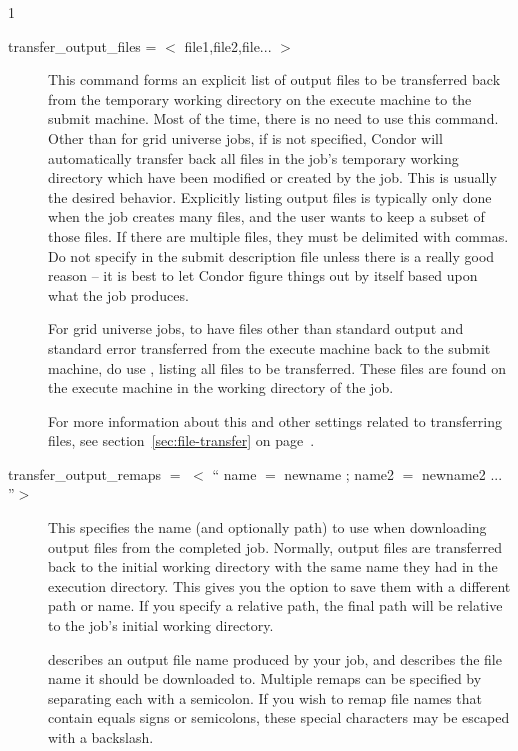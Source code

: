 \begin{ManPage}{\label{man-condor-submit}}{1}
\begin{description}
\item[transfer\_output\_files = $<$ file1,file2,file... $>$]
This command forms an explicit list of output files to be transferred
back from the temporary working directory on the execute machine to
the submit machine.
Most of the time, there is no need to use this command.
Other than for grid universe jobs,
if  is not specified,
Condor will automatically transfer back all files in the job's
temporary working directory which have been
modified or created by the job.
This is usually the desired behavior.
Explicitly listing output files is typically only done when the job creates
many files, and the user wants to keep a subset of
those files.
If there are multiple files, they must be delimited with commas.
\Warn Do not specify  in the
submit description file unless there is a really good reason -- it is
best to let Condor figure things out by itself based upon what
the job produces.

For grid universe jobs,
to have files other than standard output and standard error transferred
from the execute machine back to the submit machine,
do use , listing
all files to be transferred.
These files are found on the execute machine in the
working directory of the job.

For more information about this and other settings related to
transferring files, see section~\ref{sec:file-transfer} on
page~\pageref{sec:file-transfer}.


\item[transfer\_output\_remaps $=$ $<$ `` name $=$ newname ; name2 $=$ newname2 ... ''$>$ ]
This specifies the name (and optionally path) to use when downloading output
files from the completed job.  Normally, output files are transferred back
to the initial working directory with the same name they had in the execution
directory.  This gives you the option to save them with a different path
or name.  If you specify a relative path, the final path will be relative
to the job's initial working directory.

 describes an output file name produced by your job, and
 describes the file name it should be downloaded to.
Multiple remaps can be specified by separating each with a semicolon.
If you wish to remap file names that contain equals signs or
semicolons, these special characters may be escaped with a backslash.



\end{description}
\end{ManPage}
